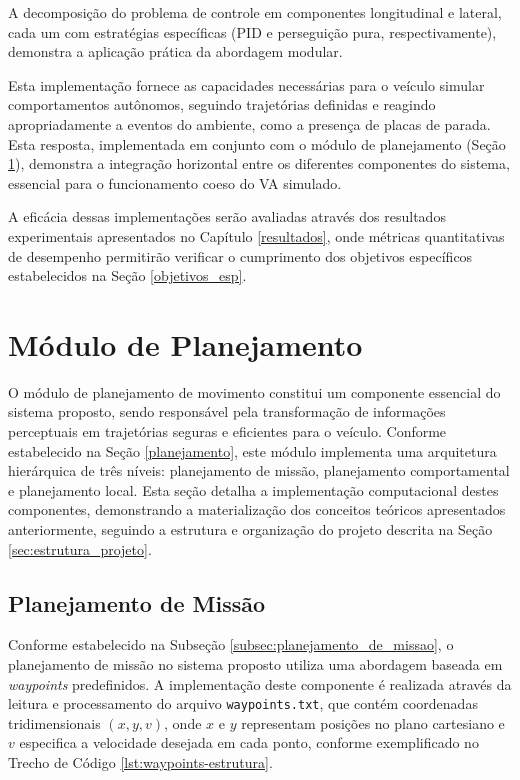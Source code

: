 A decomposição do problema de controle em componentes longitudinal e lateral, cada um com estratégias específicas (PID e perseguição pura, respectivamente), demonstra a aplicação prática da abordagem modular.

Esta implementação fornece as capacidades necessárias para o veículo simular comportamentos autônomos, seguindo trajetórias definidas e reagindo apropriadamente a eventos do ambiente, como a presença de placas de parada. Esta resposta, implementada em conjunto com o módulo de planejamento (Seção \ref{implementacao_planejamento}), demonstra a integração horizontal entre os diferentes componentes do sistema, essencial para o funcionamento coeso do VA simulado.

A eficácia dessas implementações serão avaliadas através dos resultados experimentais apresentados no Capítulo \ref{resultados}, onde métricas quantitativas de desempenho permitirão verificar o cumprimento dos objetivos específicos estabelecidos na Seção \ref{objetivos_esp}.

\section{Módulo de Planejamento} \label{implementacao_planejamento}

O módulo de planejamento de movimento constitui um componente essencial do sistema proposto, sendo responsável pela transformação de informações perceptuais em trajetórias seguras e eficientes para o veículo. Conforme estabelecido na Seção \ref{planejamento}, este módulo implementa uma arquitetura hierárquica de três níveis: planejamento de missão, planejamento comportamental e planejamento local. Esta seção detalha a implementação computacional destes componentes, demonstrando a materialização dos conceitos teóricos apresentados anteriormente, seguindo a estrutura e organização do projeto descrita na Seção \ref{sec:estrutura_projeto}.

\subsection{Planejamento de Missão} \label{subsec:implementacao_missao}

Conforme estabelecido na Subseção \ref{subsec:planejamento_de_missao}, o planejamento de missão no sistema proposto utiliza uma abordagem baseada em \textit{waypoints} predefinidos. A implementação deste componente é realizada através da leitura e processamento do arquivo \texttt{waypoints.txt}, que contém coordenadas tridimensionais $(x, y, v)$, onde $x$ e $y$ representam posições no plano cartesiano e $v$ especifica a velocidade desejada em cada ponto, conforme exemplificado no Trecho de Código \ref{lst:waypoints-estrutura}.

